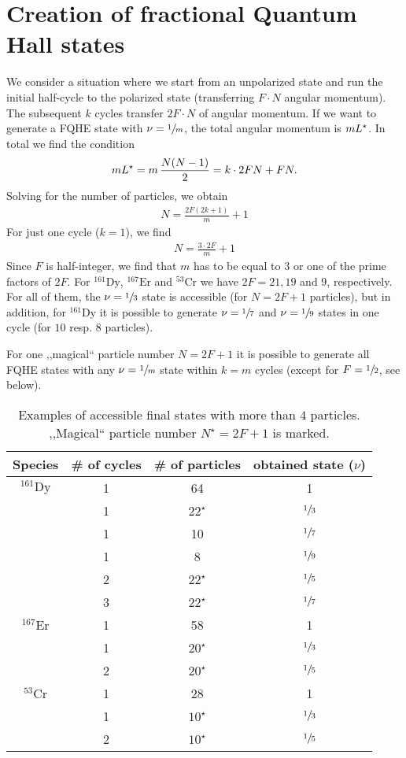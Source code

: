 \section{Creation of fractional Quantum Hall states}
We consider a situation where we start from an unpolarized state and run the initial half-cycle to the polarized state (transferring $F\cdot N$ angular momentum). The subsequent $k$ cycles transfer $2F \cdot N$ of angular momentum. If we want to generate a FQHE state with $\nu=\sfrac{1}{m}$, the total angular momentum is $mL^{\star}$. In total we find the condition
\begin{align*}
mL^{\star}=m\,\frac{N(N-1)}{2} = k\cdot 2F N + F N.
\end{align*}
Solving for the number of particles, we obtain
\begin{align*}
N=\frac{2F(2k+1)}{m} + 1
\end{align*}
For just one cycle ($k=1$), we find
\begin{align*}
N=\frac{3\cdot 2F}{m}+1
\end{align*}
Since $F$ is half-integer, we find that $m$ has to be equal to $3$ or one of the prime factors of $2F$.
For  $^{161}\text{Dy}$, $^{167}\text{Er}$ and $^{53}\text{Cr}$ we have $2F=21, 19$ and $9$, respectively. For all of them, the $\nu = \sfrac{1}{3}$ state is accessible (for $N=2F+1$ particles), but in addition, for $^{161}\text{Dy}$ it is possible to generate $\nu=\sfrac{1}{7}$ and $\nu=\sfrac{1}{9}$ states in one cycle (for $10$ resp. $8$ particles).

For one ,,magical`` particle number $N=2F+1$ it is possible to generate all FQHE states with any $\nu=\sfrac{1}{m}$ state within $k=m$ cycles (except for $F=\sfrac{1}{2}$, see below).

\begin{table}[ht]
    \centering
    \begin{tabular}{ c c c c }
    \hline
    Species & \# of cycles & \# of particles & obtained state ($\nu$) \\
    \toprule
    $^{161}\text{Dy}$ & 1 & 64 & 1 \\
    & 1 & $22^\star$ & $\sfrac{1}{3}$ \\
    & 1 & 10 & $\sfrac{1}{7}$ \\
    & 1 & 8 & $\sfrac{1}{9}$ \\
    & 2 & $22^\star$ & $\sfrac{1}{5}$ \\
    & 3 & $22^\star$ & $\sfrac{1}{7}$ \\
    \midrule
    $^{167}\text{Er}$ & 1 & 58 & 1 \\
    & 1 & $20^\star$ & $\sfrac{1}{3}$ \\
    & 2 & $20^\star$ & $\sfrac{1}{5}$ \\
    \midrule
    $^{53}\text{Cr}$ & 1 & 28 & 1 \\
    & 1 & $10^\star$ & $\sfrac{1}{3}$ \\
    & 2 & $10^\star$ & $\sfrac{1}{5}$ \\
    \hline
    \end{tabular}
    \caption{Examples of accessible final states with more than $4$ particles. ,,Magical`` particle number $N^\star=2F+1$ is marked.}
\end{table}

